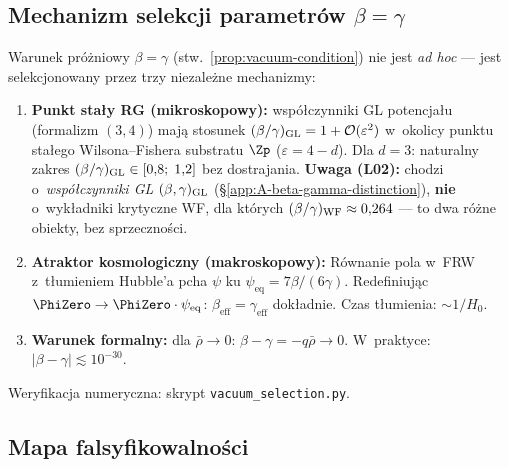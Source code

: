 \subsection{Mechanizm selekcji parametr\'ow $\beta = \gamma$}\label{ssec:vacuum-selection}

\begin{proposition}[Selekcja pr\'o\.zniowa $\beta = \gamma$]%
\label{prop:vacuum-selection}
Warunek pr\'o\.zniowy $\beta = \gamma$ (stw.~\ref{prop:vacuum-condition})
nie jest \emph{ad hoc} --- jest selekcjonowany przez trzy
niezale\.zne mechanizmy:
\begin{enumerate}[nosep]
  \item \textbf{Punkt sta\l{}y RG (mikroskopowy):}
    wsp\'o\l{}czynniki GL potencja\l{}u (formalizm $(3,4)$) maj\k{a}
    stosunek $(\beta/\gamma)_{\rm GL} = 1 + \mathcal{O}(\varepsilon^2)$
    w~okolicy punktu sta\l{}ego Wilsona--Fishera substratu $\Zp$
    ($\varepsilon = 4-d$). Dla $d = 3$: naturalny zakres
    $(\beta/\gamma)_{\rm GL} \in [0{,}8;\;1{,}2]$ bez dostrajania.
    \textbf{Uwaga (L02):} chodzi o~\emph{wsp\'o\l{}czynniki GL}
    $(\beta,\gamma)_{\rm GL}$ (\S\ref{app:A-beta-gamma-distinction}),
    \textbf{nie} o~wyk\l{}adniki krytyczne WF, dla kt\'orych
    $(\beta/\gamma)_{\rm WF}\approx0{,}264$ --- to dwa r\'o\.zne
    obiekty, bez sprzeczno\'sci.
  \item \textbf{Atraktor kosmologiczny (makroskopowy):}
    R\'ownanie pola w~FRW z~t\l{}umieniem Hubble'a
    pcha $\psi$ ku $\psi_{\mathrm{eq}} = 7\beta/(6\gamma)$.
    Redefiniuj\k{a}c $\PhiZero \to \PhiZero\cdot\psi_{\mathrm{eq}}$:
    $\beta_{\mathrm{eff}} = \gamma_{\mathrm{eff}}$ dok\l{}adnie.
    Czas t\l{}umienia: $\sim 1/H_0$.
  \item \textbf{Warunek formalny:}
    dla $\bar\rho \to 0$: $\beta - \gamma = -q\bar\rho \to 0$.
    W~praktyce: $|\beta - \gamma| \lesssim 10^{-30}$.
\end{enumerate}
Weryfikacja numeryczna: skrypt \texttt{vacuum\_selection.py}.
\end{proposition}

\subsection{Mapa falsyfikowalno\'sci}\label{ssec:falsification}

